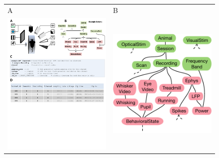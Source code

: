 \documentclass[10pt,letterpaper]{article}
\begin{document}
\begin{figure}
\begin{adjustwidth}{-2.25in}{0in} %
\begin{tabular}{p{0.5\linewidth}p{0.5\linewidth}}
{\sf \large A} & {\sf \large B}
\\
\vspace{0pt}\includegraphics{./figures/experiment.pdf} &
\vspace{0pt}\includegraphics{./figures/schema.pdf}
\\
\end{tabular}


\end{adjustwidth}
\end{figure}
\end{document}
